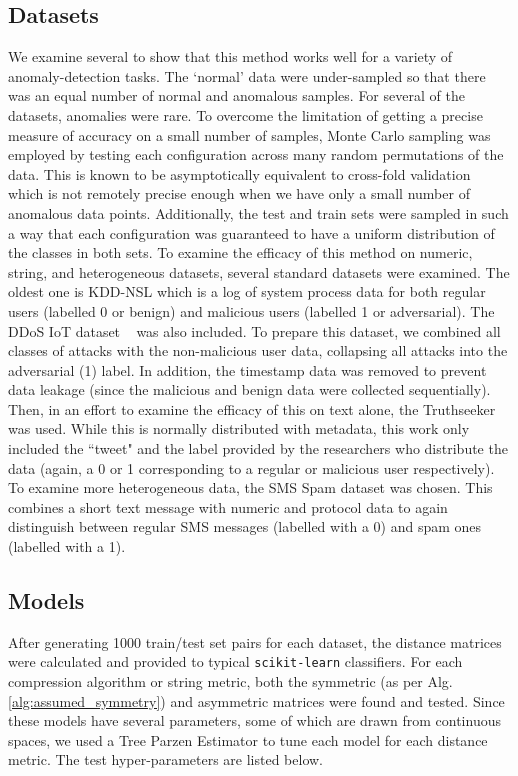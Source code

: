 \documentclass{article}
\begin{document}
\subsection{Datasets}
\label{datasets}
We examine several to show that this method works well for a variety of anomaly-detection tasks. The `normal' data were under-sampled so that there was an equal number of normal and anomalous samples. For several of the datasets, anomalies were rare. 
To overcome the limitation of getting a precise measure of accuracy on a small number of samples, Monte Carlo sampling was employed by testing each configuration across many random permutations of the data. 
This is known to be asymptotically equivalent to cross-fold validation~\cite{} which is not remotely precise enough when we have only a small number of anomalous data points. 
Additionally, the test and train sets were sampled in such a way that each configuration was guaranteed to have a uniform distribution of the classes in both sets. To examine the efficacy of this method on numeric, string, and heterogeneous datasets, several standard datasets were examined. 
The oldest one is KDD-NSL which is a log of system process data for both regular users (labelled 0 or benign) and malicious users (labelled 1 or adversarial). The DDoS IoT dataset ~\cite{} was also included. 
To prepare this dataset, we combined all classes of attacks with the non-malicious user data, collapsing all attacks into the adversarial (1) label. In addition, the timestamp data was removed to prevent data leakage  (since the malicious and benign data were collected sequentially). 
Then, in an effort to examine the efficacy of this on text alone, the Truthseeker ~\cite{} was used. While this is normally distributed with metadata, this work only included the ``tweet" and the label provided by the researchers who distribute the data (again, a 0 or 1 corresponding to a regular or malicious user respectively). 
To examine more heterogeneous data, the SMS Spam dataset was chosen. 
This combines a short text message with numeric and protocol data to again distinguish between regular SMS messages (labelled with a 0) and spam ones (labelled with a 1). 

\subsection{Models}

After generating 1000 train/test set pairs for each dataset, the distance matrices were calculated and provided to typical \texttt{scikit-learn} classifiers. For each compression algorithm or string metric, both the symmetric (as per  Alg. \ref{alg:assumed_symmetry}) and asymmetric matrices were found and tested. Since these models have several parameters, some of which are drawn from continuous spaces, we used a Tree Parzen Estimator to tune each model for each distance metric. The test hyper-parameters are listed below.
\end{document}
